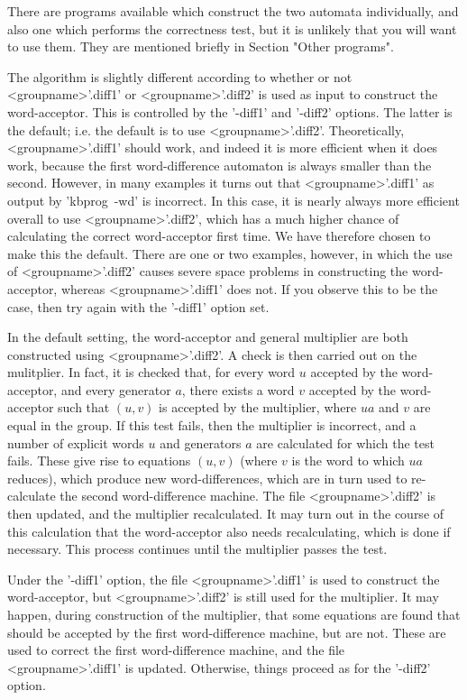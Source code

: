 There are programs available which construct the two automata individually,
and also one which performs the correctness test, but it is unlikely that
you will want to use them. They are mentioned briefly in
Section "Other programs".

The algorithm is slightly different according to whether or not
<groupname>'.diff1' or <groupname>'.diff2' is used as input to construct
the word-acceptor. This is controlled by the '-diff1' and '-diff2' options.
The latter is the default; i.e. the default is to use <groupname>'.diff2'.
Theoretically, <groupname>'.diff1' should work, and indeed it is more
efficient when it does work, because the first word-difference automaton is
always smaller than the second. However, in many examples it turns out that
<groupname>'.diff1' as output by 'kbprog\ -wd' is incorrect. In this case, it
is nearly always more efficient overall to use <groupname>'.diff2', which has
a much higher chance of calculating the correct word-acceptor first time. We
have therefore chosen to make this the default. There are one or two
examples, however, in which the use of <groupname>'.diff2' causes severe
space problems in constructing the word-acceptor, whereas <groupname>'.diff1'
does not. If you observe this to be the case, then try again with the
'-diff1' option set.

In the default setting, the word-acceptor and general multiplier are both
constructed using <groupname>'.diff2'. A check is then carried out on the
mulitplier. In fact, it is checked that, for every word $u$ accepted by
the word-acceptor, and every generator $a$, there exists a word $v$
accepted by the word-acceptor such that $(u,v)$ is accepted by the multiplier,
where $ua$ and $v$ are equal in the group.
If this test fails, then the multiplier is incorrect, and a number of explicit
words $u$ and generators $a$ are calculated for which the test fails.
These give rise to equations $(u,v)$ (where $v$ is the word to which
$ua$ reduces), which produce new word-differences, which are in turn used
to re-calculate the second word-difference machine. The file
<groupname>'.diff2' is then updated, and the multiplier recalculated. It
may turn out in the course of this calculation that the word-acceptor also
needs recalculating, which is done if necessary. This process continues
until the multiplier passes the test.

Under the '-diff1' option, the file <groupname>'.diff1' is used to construct
the word-acceptor, but <groupname>'.diff2' is still used for the multiplier.
It may happen, during construction of the multiplier, that some equations
are found that should be accepted by the first word-difference machine, but
are not. These are used to correct the first word-difference machine, and
the file <groupname>'.diff1' is updated. Otherwise, things proceed as for the
'-diff2' option.

